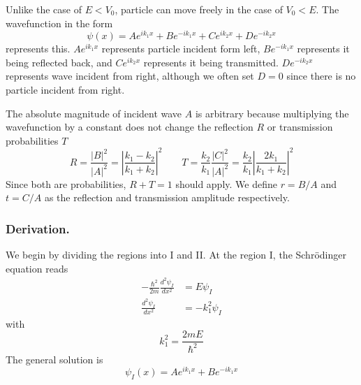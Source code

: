 \documentclass[../../../main.tex]{subfiles}
\begin{document}
Unlike the case of $E<V_0$, particle can move freely in the case of $V_0<E$.
The wavefunction in the form
\begin{equation*}
    \psi(x)=Ae^{ik_1x}+Be^{-ik_1x}+Ce^{ik_2 x}+De^{-ik_2x}
\end{equation*}
represents this.
$Ae^{ik_1x}$ represents particle incident form left, $Be^{-ik_1x}$ represents it being reflected back, and $Ce^{ik_2 x}$ represents it being transmitted.
$De^{-ik_2x}$ represents wave incident from right, although we often set $D=0$ since there is no particle incident from right.

The absolute magnitude of incident wave $A$ is arbitrary because multiplying the wavefunction by a constant does not change the reflection $R$ or transmission probabilities $T$
\begin{equation*}
    R=\frac{|B|^2}{|A|^2}=\left|\frac{k_1-k_2 }{k_1+k_2}\right|^2
    \qquad
    T = \frac{k_2}{k_1} \frac{|C|^2}{|A|^2} = \frac{k_2}{k_1} \left| \frac{2 k_1}{k_1 + k_2} \right|^2
\end{equation*}
Since both are probabilities, $R+T=1$ should apply.
We define $r=B/A$ and $t=C/A$ as the reflection and transmission amplitude respectively.

\subsubsection{Derivation.}
We begin by dividing the regions into I and II.
At the region I, the Schrödinger equation reads
\begin{align*}
    -\frac{\hbar^2}{2m} \frac{d^2 \psi_{I}}{dx^2} & =  E \psi_I        \\
    \frac{d^2 \psi_{I}}{dx^2}                     & = - k_1^2 \psi_{I}
\end{align*}
with
\begin{equation*}
    k_1^2 =\frac{2 m E}{\hbar^2}
\end{equation*}
The general solution is
\begin{equation*}
    \psi_I(x) = A e^{i k_1 x} + B e^{-i k_1 x}
\end{equation*}
\end{document}
